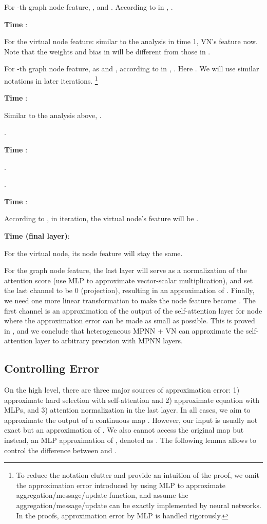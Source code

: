 \documentclass[nohyperref]{article}
\theoremstyle{plain}
\theoremstyle{definition}
\theoremstyle{remark}
\begin{document}
For -th graph node feature,  , and . According to  in  , .

\textbf{Time }:

For the virtual node feature: similar to the analysis in time 1, VN's feature  now. Note that the weights and bias in  will be different from those in .

For -th graph node feature, as  and , according to  in  , . Here . We will use similar notations in later iterations. 
\footnote{To reduce the notation clutter and provide an intuition of the proof, we omit the approximation error introduced by using MLP to approximate
aggregation/message/update function, and assume the aggregation/message/update can be exactly implemented by neural networks. In the proofs, approximation error by MLP is handled rigorously. } 

\textbf{Time }:

Similar to the analysis above, .

.

\textbf{Time }:

. 

.

\textbf{Time }:

According to , in  iteration, the virtual node's feature will be . 



\textbf{Time  (final layer)}:

For the virtual node, its node feature will stay the same.

For the graph node feature, the last layer will serve as a normalization of the attention score (use MLP to approximate vector-scalar multiplication), and set the last channel to be 0 (projection), resulting in an approximation of . Finally, we need one more linear transformation to make the node feature become . The first  channel is an approximation of the output of the self-attention layer for node  where the approximation error can be made as small as possible. This is proved in , and we conclude that heterogeneous MPNN + VN can approximate the self-attention layer  to arbitrary precision with  MPNN layers.

\subsection{Controlling Error}\label{subsec-controling-error}

On the high level, there are three major sources of approximation error: 1) approximate hard selection with self-attention and 2) approximate equation  with MLPs, and 3) attention normalization in the last layer. In all cases, we aim to approximate the output of a continuous map . However, our input is usually not exact  but an approximation of . We also cannot access the original map  but instead, an MLP approximation of , denoted as . The following lemma allows to control the difference between  and . 
\end{document}

